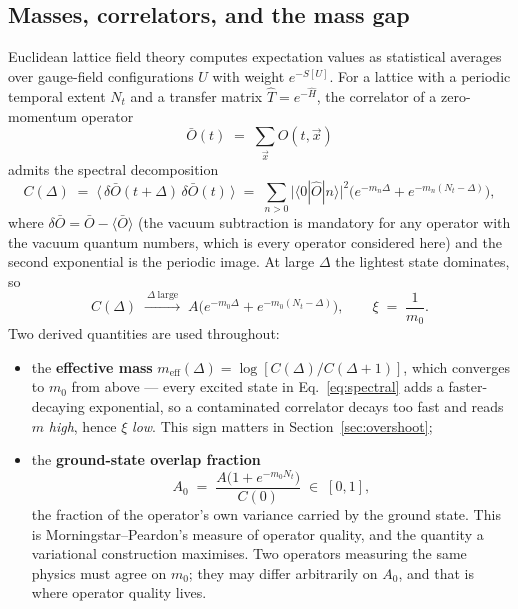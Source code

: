 \documentclass[11pt,a4paper]{article}
\newcommand{\Obar}{\bar{O}}
\newcommand{\meff}{m_{\mathrm{eff}}}
\newcommand{\That}{\hat{T}}
\begin{document}
\subsection{Masses, correlators, and the mass gap}
\label{sec:masses}

Euclidean lattice field theory computes expectation values as statistical
averages over gauge-field configurations $U$ with weight $e^{-S[U]}$. For a
lattice with a periodic temporal extent $N_t$ and a transfer matrix
$\That = e^{-\hat{H}}$, the correlator of a zero-momentum operator
\begin{equation}
  \Obar(t) \;=\; \sum_{\vec{x}} O(t,\vec{x})
\end{equation}
admits the spectral decomposition
\begin{equation}
  C(\Delta) \;=\; \big\langle\, \delta\Obar(t+\Delta)\, \delta\Obar(t) \,\big\rangle
  \;=\; \sum_{n>0} \big| \langle 0 | \hat{O} | n \rangle \big|^2
        \Big( e^{-m_n \Delta} + e^{-m_n (N_t - \Delta)} \Big),
  \label{eq:spectral}
\end{equation}
where $\delta\Obar = \Obar - \langle\Obar\rangle$ (the vacuum subtraction is
mandatory for any operator with the vacuum quantum numbers, which is every
operator considered here) and the second exponential is the periodic image. At
large $\Delta$ the lightest state dominates, so
\begin{equation}
  C(\Delta) \;\xrightarrow{\ \Delta\ \text{large}\ }\;
  A\Big( e^{-m_0\Delta} + e^{-m_0(N_t-\Delta)} \Big),
  \qquad
  \xi \;=\; \frac{1}{m_0}.
\end{equation}
Two derived quantities are used throughout:
\begin{itemize}
  \item the \textbf{effective mass} $\meff(\Delta) = \log[C(\Delta)/C(\Delta+1)]$,
        which converges to $m_0$ from above --- every excited state in
        Eq.~\eqref{eq:spectral} adds a faster-decaying exponential, so a
        contaminated correlator decays too fast and reads $m$ \emph{high},
        hence $\xi$ \emph{low}. This sign matters in
        Section~\ref{sec:overshoot};
  \item the \textbf{ground-state overlap fraction}
        \begin{equation}
          A_0 \;=\; \frac{A\big(1 + e^{-m_0 N_t}\big)}{C(0)}
          \;\in\; [0,1],
          \label{eq:A0}
        \end{equation}
        the fraction of the operator's own variance carried by the ground
        state. This is Morningstar--Peardon's measure of operator quality, and
        the quantity a variational construction maximises. Two operators
        measuring the same physics must agree on $m_0$; they may differ
        arbitrarily on $A_0$, and that is where operator quality lives.
\end{itemize}
\end{document}
